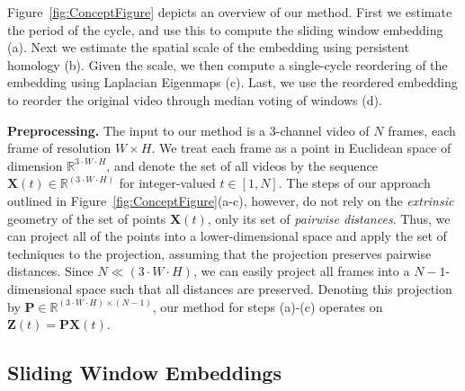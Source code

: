 \documentclass{article}
\begin{document}
Figure~\ref{fig:ConceptFigure} depicts an overview of our method. First we estimate the period of the cycle, and use this to compute the sliding window embedding (a). Next we estimate the spatial scale of the embedding using persistent homology (b). Given the scale, we then compute a single-cycle reordering of the embedding using Laplacian Eigenmaps (c). Last, we use the reordered embedding to reorder the original video through median voting of windows (d).

\textbf{Preprocessing.} The input to our method is a 3-channel video of $N$ frames, each frame of resolution $W \times H$. We treat each frame as a point in Euclidean space of dimension $\mathbb{R}^{3 \cdot W \cdot H}$, and denote the set of all videos by the sequence $\mathbf{X}(t) \in \mathbb{R}^{(3 \cdot W \cdot H)}$ for integer-valued $t \in [1,N]$. The steps of our approach outlined in Figure~\ref{fig:ConceptFigure}(a-c), however, do not rely on the {\em extrinsic} geometry of the set of points $\mathbf{X}(t)$, only its set of {\em pairwise distances}. Thus, we can project all of the points into a lower-dimensional space and apply the set of techniques to the projection, assuming that the projection preserves pairwise distances. Since $N \ll (3 \cdot W \cdot H)$, we can easily project all frames into a $N-1$-dimensional space such that all distances are preserved. Denoting this projection by $\mathbf{P} \in \mathbb{R}^{(3 \cdot W \cdot H) \times (N-1)}$, our method for steps (a)-(c) operates on $\mathbf{Z}(t) = \mathbf{P} \mathbf{X}(t)$.


\subsection{Sliding Window Embeddings}
\label{sec:slidingwindow}
\end{document}
